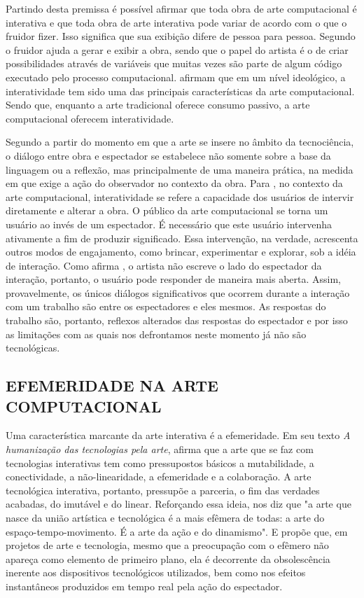 Partindo desta premissa é possível afirmar que toda obra de arte computacional é interativa e que toda obra de arte interativa pode variar de acordo com o que o fruidor fizer. Isso significa que sua exibição difere de pessoa para pessoa. Segundo  o fruidor ajuda a gerar e exibir a obra, sendo que o papel do artista é o de criar possibilidades através de variáveis que muitas vezes são parte de algum código executado pelo processo computacional.  afirmam que em um nível ideológico, a interatividade tem sido uma das principais características da arte computacional. Sendo que, enquanto a arte tradicional oferece consumo passivo, a arte computacional oferecem interatividade.

Segundo  a partir do momento em que a arte se insere no âmbito da tecnociência, o diálogo entre obra e espectador se estabelece não somente sobre a base da linguagem ou a reflexão, mas principalmente de uma maneira prática, na medida em que exige a ação do observador no contexto da obra. Para , no contexto da arte computacional, interatividade se refere a capacidade dos usuários de intervir diretamente e alterar a obra. O público da arte computacional se torna um usuário ao invés de um espectador. É necessário que este usuário intervenha ativamente a fim de produzir significado. Essa intervenção, na verdade, acrescenta outros modos de engajamento, como brincar, experimentar e explorar, sob a idéia de interação. Como afirma , o artista não escreve o lado do espectador da interação, portanto, o usuário pode responder de maneira mais aberta. Assim, provavelmente, os únicos diálogos significativos que ocorrem durante a interação com um trabalho são entre os espectadores e eles mesmos. As respostas do trabalho são, portanto, reflexos alterados das respostas do espectador e por isso as limitações com as quais nos defrontamos neste momento já não são tecnológicas.


\subsection{EFEMERIDADE NA ARTE COMPUTACIONAL}

Uma característica marcante da arte interativa é a efemeridade. Em seu texto \textit{A humanização das tecnologias pela arte},  afirma que a arte que se faz com tecnologias interativas tem como pressupostos básicos a mutabilidade, a conectividade, a não-linearidade, a efemeridade e a colaboração. A arte tecnológica interativa, portanto, pressupõe a parceria, o fim das verdades acabadas, do imutável e do linear. Reforçando essa ideia,  nos diz que "a arte que nasce da união artística e tecnológica é a mais efêmera de todas: a arte do espaço-tempo-movimento. É a arte da ação e do dinamismo". E  propõe que, em projetos de arte e tecnologia, mesmo que a preocupação com o efêmero não apareça como elemento de primeiro plano, ela é decorrente da obsolescência inerente aos dispositivos tecnológicos utilizados, bem como nos efeitos instantâneos produzidos em tempo real pela ação do espectador.

